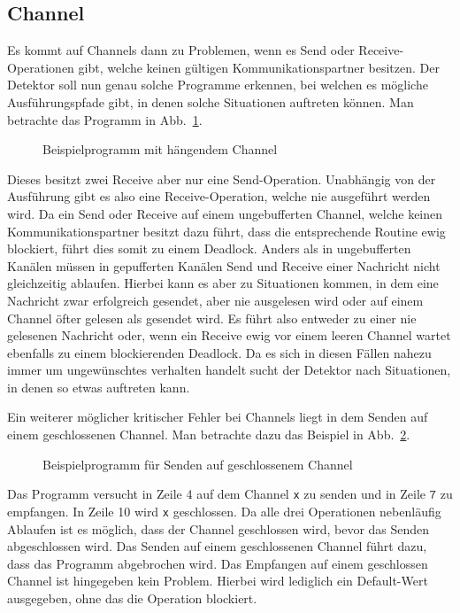 \subsection{Channel}\label{Chap:Back-Sec:Prob-SubSec:Channel}
Es kommt auf Channels dann zu Problemen, wenn es Send oder Receive-Operationen 
gibt, welche keinen gültigen Kommunikationspartner besitzen.
Der Detektor soll nun genau solche Programme erkennen, bei welchen es 
mögliche Ausführungspfade gibt, in denen solche Situationen auftreten können.
Man betrachte das Programm in Abb.~\ref{Chap:Analyze-Sec:Channel-SubSec:Dangling-Fig:ExDangling}.
\begin{figure}[h!]
  
  \caption{Beispielprogramm mit hängendem Channel}
  \label{Chap:Analyze-Sec:Channel-SubSec:Dangling-Fig:ExDangling}
\end{figure}
Dieses besitzt zwei Receive aber nur eine Send-Operation. Unabhängig von der Ausführung 
gibt es also eine Receive-Operation, welche nie ausgeführt werden wird. 
Da ein Send oder Receive auf einem ungebufferten Channel, welche keinen 
Kommunikationspartner besitzt dazu führt, dass die entsprechende Routine 
ewig blockiert, führt dies somit zu einem Deadlock. 
Anders als in ungebufferten Kanälen müssen in gepufferten Kanälen Send und 
Receive einer Nachricht nicht gleichzeitig ablaufen. Hierbei kann es aber 
zu Situationen kommen, in dem eine Nachricht zwar erfolgreich gesendet, aber
nie ausgelesen wird oder auf einem Channel öfter gelesen als 
gesendet wird. Es führt also entweder zu einer nie gelesenen Nachricht 
oder, wenn ein Receive ewig vor einem leeren Channel wartet ebenfalls zu einem 
blockierenden Deadlock. Da es sich in diesen Fällen 
nahezu immer um ungewünschtes verhalten handelt sucht der Detektor nach 
Situationen, in denen so etwas auftreten kann.

Ein weiterer möglicher kritischer Fehler bei Channels liegt in dem 
Senden auf einem geschlossenen Channel. Man betrachte dazu das Beispiel in 
Abb.~\ref{Chap:Analyze-Sec:Channel-SubSec:Close-Fig:close}. 
\begin{figure}[h!]
  
  \caption{Beispielprogramm für Senden auf geschlossenem Channel} 
  \label{Chap:Analyze-Sec:Channel-SubSec:Close-Fig:close}
\end{figure}
Das Programm 
versucht in Zeile 4 auf dem Channel \texttt{x} zu senden und in Zeile 
$\texttt{7}$ zu empfangen. In Zeile 10 wird \texttt{x} geschlossen. Da alle 
drei Operationen nebenläufig Ablaufen ist es möglich, dass der Channel 
geschlossen wird, bevor das Senden abgeschlossen wird.
Das Senden auf einem geschlossenen Channel führt dazu, dass das Programm 
abgebrochen wird. 
Das Empfangen auf einem geschlossen Channel ist hingegeben kein Problem.
Hierbei wird lediglich ein Default-Wert ausgegeben, ohne das die Operation
blockiert. 


